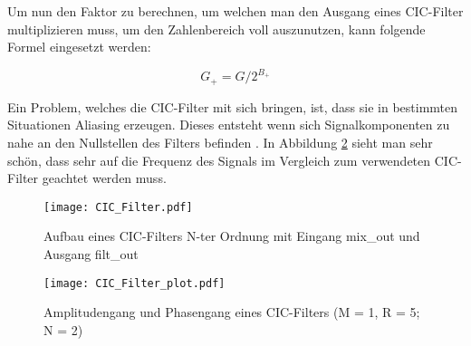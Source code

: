 Um nun den Faktor zu berechnen, um welchen man den Ausgang eines CIC-Filter multiplizieren muss, um den Zahlenbereich voll auszunutzen, kann folgende Formel eingesetzt werden:

\begin{equation}
G_+ = G/2^{B_+}
\label{equ:cic_gain+}
\end{equation}

Ein Problem, welches die CIC-Filter mit sich bringen, ist, dass sie in bestimmten Situationen Aliasing erzeugen. Dieses entsteht wenn sich Signalkomponenten zu nahe an den Nullstellen des Filters befinden \cite{CIC_Aliasing}. In Abbildung \ref{img:CIC_Filter_plot} sieht man sehr schön, dass sehr auf die Frequenz des Signals im Vergleich zum verwendeten CIC-Filter geachtet werden muss.


\begin{figure}[h]
	\centering
	\texttt{[image: CIC\_Filter.pdf]}
	\caption{Aufbau eines CIC-Filters N-ter Ordnung mit Eingang mix\_out und Ausgang filt\_out}
	\label{img:CIC_Filter}
\end{figure}

\begin{figure}[h]
	\centering
	\texttt{[image: CIC\_Filter\_plot.pdf]}
	\caption{Amplitudengang und Phasengang eines CIC-Filters (M = 1, R = 5; N = 2)}
	\label{img:CIC_Filter_plot}
\end{figure}

\clearpage
